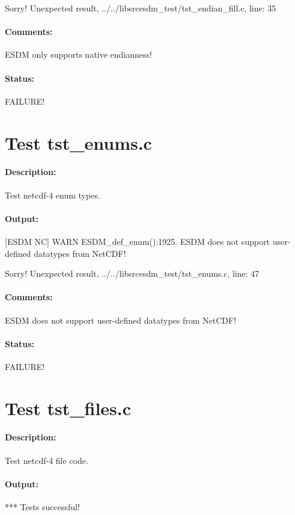 Sorry! Unexpected result, ../../libsrcesdm\_test/tst\_endian\_fill.c, line: 35

\paragraph{Comments:} ESDM only supports native endianness!

\paragraph{Status:} FAILURE!

\section{Test tst\_enums.c}

\paragraph{Description:} Test netcdf-4 enum types.

\paragraph{Output:} [ESDM NC] WARN ESDM\_def\_enum():1925. ESDM does not support user-defined datatypes from NetCDF!

Sorry! Unexpected result, ../../libsrcesdm\_test/tst\_enums.c, line: 47

\paragraph{Comments:} ESDM does not support user-defined datatypes from NetCDF!

\paragraph{Status:} FAILURE!

\section{Test tst\_files.c}

\paragraph{Description:} Test netcdf-4 file code.

\paragraph{Output:} *** Tests successful!

